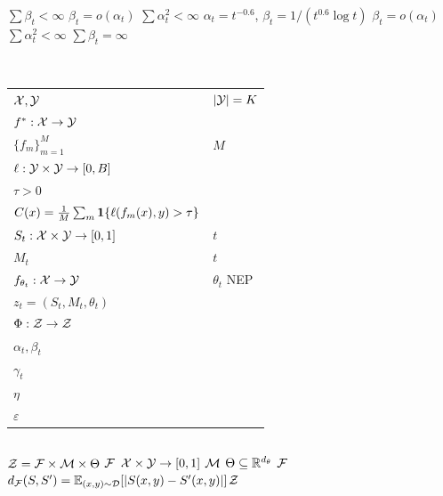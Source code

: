 \textbf{}$\sum \beta_t < \infty$ \textbf{} $\beta_t = o(\alpha_t)$  $\sum \alpha_t^2 < \infty$ $\alpha_t = t^{-0.6}$, $\beta_t = 1/(t^{0.6} \log t)$  $\beta_t = o(\alpha_t)$  $\sum \alpha_t^2 < \infty$ $\sum \beta_t = \infty$

\section{}

\subsection{}

\begin{table}[ht]
\centering
\caption{}
\label{tab:notation}
\begin{tabular}{@{}ll@{}}
\toprule
 &  \\
\midrule
$\mathcal{X}, \mathcal{Y}$ & $|\mathcal{Y}| = K$ \\
$f^*: \mathcal{X} \to \mathcal{Y}$ &  \\
$\{f_m\}_{m=1}^M$ & $M$  \\
$\ell: \mathcal{Y} \times \mathcal{Y} \to [0, B]$ &  \\
$\tau > 0$ &  \\
$C(x) = \frac{1}{M}\sum_m \mathbf{1}\{\ell(f_m(x), y) > \tau\}$ &  \\
$S_t: \mathcal{X} \times \mathcal{Y} \to [0,1]$ &  $t$  \\
$M_t$ &  $t$  \\
$f_{\theta_t}: \mathcal{X} \to \mathcal{Y}$ &  $\theta_t$  NEP  \\
$z_t = (S_t, M_t, \theta_t)$ &  \\
$\Phi: \mathcal{Z} \to \mathcal{Z}$ &  \\
$\alpha_t, \beta_t$ &  \\
$\gamma_t$ &  \\
$\eta$ &  \\
$\varepsilon$ &  \\
\bottomrule
\end{tabular}
\end{table}

\subsection{}

 $\mathcal{Z} = \mathcal{F} \times \mathcal{M} \times \Theta$ $\mathcal{F}$  $\mathcal{X} \times \mathcal{Y} \to [0,1]$ $\mathcal{M}$ $\Theta \subseteq \mathbb{R}^{d_\theta}$ $\mathcal{F}$  $d_{\mathcal{F}}(S, S') = \mathbb{E}_{(x,y) \sim \mathcal{D}}[|S(x,y) - S'(x,y)|]$$\mathcal{Z}$ 



